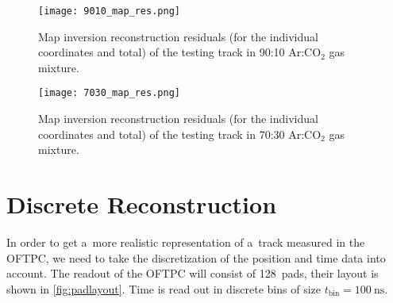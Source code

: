 			\begin{figure}
				\centering
				\texttt{[image: 9010\_map\_res.png]}
				\caption{Map inversion reconstruction residuals (for the individual coordinates and total) of the testing track in 90:10 Ar:CO$_2$ gas mixture.}
				\label{fig:9010_map_res}
			\end{figure}
			
			\begin{figure}
				\centering
				\texttt{[image: 7030\_map\_res.png]}
				\caption{Map inversion reconstruction residuals (for the individual coordinates and total) of the testing track in 70:30 Ar:CO$_2$ gas mixture.}
				\label{fig:7030_map_res}
			\end{figure}
			
			
		
	\section{Discrete Reconstruction}		
		In order to get a~more realistic representation of a~track measured in the \ac{OFTPC}, we need to take the discretization of the position and time data into account. The readout of the \ac{OFTPC} will consist of 128~pads, their layout is shown in \cref{fig:padlayout}. Time is read out in discrete bins of size $t_\text{bin} = \qty{100}{\ns}$.
		
